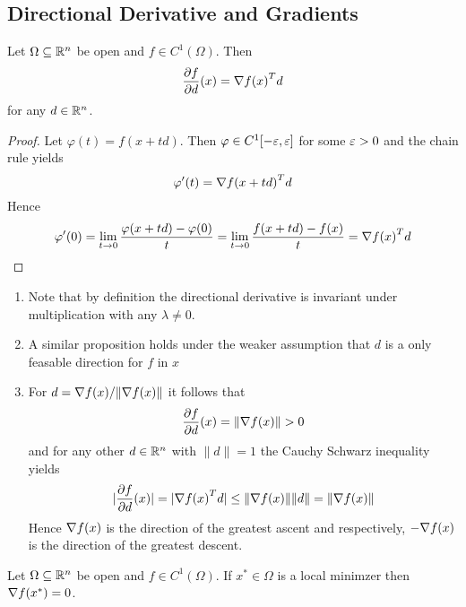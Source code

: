 \subsection{Directional Derivative and Gradients}


\begin{lemma}\label{lemma:directional_derivative}
Let \( \Omega \subseteq \mathbb{R}^n \) be open and \( f \in C^1(\Omega) \). Then
\[
    \frac{\partial f}{\partial d}(x) = \nabla{f(x)}^T d
\]
for any \( d \in \mathbb{R}^n \).
\end{lemma}

\begin{proof}
Let \( \varphi(t) = f(x + td) \). Then \( \varphi \in C^1[-\varepsilon, \varepsilon ] \) for some \( \varepsilon > 0 \) 
and the chain rule yields 
\[ 
    \varphi'(t) = {\nabla f(x + td)}^T d 
\]
Hence
\[
    \varphi'(0) = \lim_{t \to 0} \frac{\varphi(x + td) - \varphi(0)}{t} = 
        \lim_{t \to 0} \frac{f(x + td) - f(x)}{t} = {\nabla f(x)}^T d
\]
\end{proof}
\bigskip

\begin{remark}\hfill
    \begin{enumerate}
        \item Note that by definition the directional derivative is invariant under multiplication 
            with any \( \lambda \ne 0 \).

        \item A similar proposition holds under the weaker assumption that \( d \) is a only feasable direction 
            for \( f \) in \( x \)

        \item For \( d = \nabla{f(x)}/\| \nabla{f(x)}\| \) it follows that
            \[
                \frac{\partial f}{\partial d}(x) = \|\nabla{f(x)}\| > 0
            \]
            and for any other \( d \in \mathbb{R}^n \) with \( \|d\| = 1 \) the Cauchy Schwarz inequality yields
            \[
                |\frac{\partial f}{\partial d}(x)| = |\nabla{f(x)}^T d| \le \|\nabla{f(x)}\| \|d\| = 
                    \|\nabla{f(x)}\|
            \]
            Hence \( \nabla{f(x)} \) is the direction of the greatest ascent and respectively, 
            \( -\nabla{f(x)} \) is the direction of the greatest descent.
    \end{enumerate}
\end{remark}
\bigskip

\begin{theorem}\label{thm:fonc}
Let \( \Omega \subseteq \mathbb{R}^n \) be open and \( f \in C^1(\Omega) \). If \( x^* \in \Omega \) is a local minimzer then
\( \nabla f(x^*) = 0 \).
\end{theorem}

